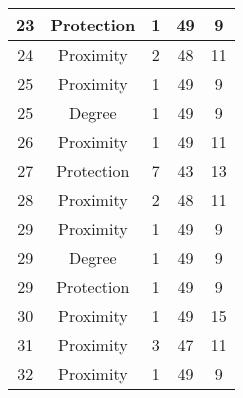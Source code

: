\documentclass[results.tex]{subfiles}
\begin{document}
\begin{center}
\begin{tabular}{| c || c | c | c | c |}
            \hline
            23                      & Protection                   & 1                      & 49                      & 9                    \\
            \hline
            24                      & Proximity                    & 2                      & 48                      & 11                   \\
            \hline
            25                      & Proximity                    & 1                      & 49                      & 9                    \\
            \hline
            25                      & Degree                       & 1                      & 49                      & 9                    \\
            \hline
            26                      & Proximity                    & 1                      & 49                      & 11                   \\
            \hline
            27                      & Protection                   & 7                      & 43                      & 13                   \\
            \hline
            28                      & Proximity                    & 2                      & 48                      & 11                   \\
            \hline
            29                      & Proximity                    & 1                      & 49                      & 9                    \\
            \hline
            29                      & Degree                       & 1                      & 49                      & 9                    \\
            \hline
            29                      & Protection                   & 1                      & 49                      & 9                    \\
            \hline
            30                      & Proximity                    & 1                      & 49                      & 15                   \\
            \hline
            31                      & Proximity                    & 3                      & 47                      & 11                   \\
            \hline
            32                      & Proximity                    & 1                      & 49                      & 9                    \\

\end{tabular}
\end{center}
\end{document}
